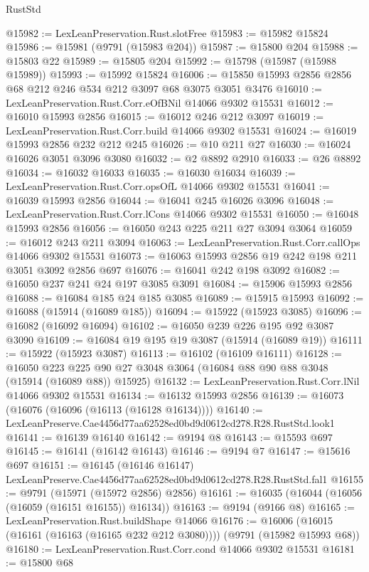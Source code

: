 \begin{lexlean}{RustStd}
\begin{coremodule}
@15982 := LexLeanPreservation.Rust.slotFree
@15983 := @15982 @15824
@15986 := @15981 (@9791 (@15983 @204))
@15987 := @15800 @204
@15988 := @15803 @22
@15989 := @15805 @204
@15992 := @15798 (@15987 (@15988 @15989))
@15993 := @15992 @15824
@16006 := @15850 @15993 @2856 @2856 @68 @212 @246 @534 @212 @3097 @68 @3075 @3051 @3476
@16010 := LexLeanPreservation.Rust.Corr.eOfBNil @14066 @9302 @15531
@16012 := @16010 @15993 @2856
@16015 := @16012 @246 @212 @3097
@16019 := LexLeanPreservation.Rust.Corr.build @14066 @9302 @15531
@16024 := @16019 @15993 @2856 @232 @212 @245
@16026 := @10 @211 @27
@16030 := @16024 @16026 @3051 @3096 @3080
@16032 := @2 @8892 @2910
@16033 := @26 @8892
@16034 := @16032 @16033
@16035 := @16030 @16034
@16039 := LexLeanPreservation.Rust.Corr.opsOfL @14066 @9302 @15531
@16041 := @16039 @15993 @2856
@16044 := @16041 @245 @16026 @3096
@16048 := LexLeanPreservation.Rust.Corr.lCons @14066 @9302 @15531
@16050 := @16048 @15993 @2856
@16056 := @16050 @243 @225 @211 @27 @3094 @3064
@16059 := @16012 @243 @211 @3094
@16063 := LexLeanPreservation.Rust.Corr.callOps @14066 @9302 @15531
@16073 := @16063 @15993 @2856 @19 @242 @198 @211 @3051 @3092 @2856 @697
@16076 := @16041 @242 @198 @3092
@16082 := @16050 @237 @241 @24 @197 @3085 @3091
@16084 := @15906 @15993 @2856
@16088 := @16084 @185 @24 @185 @3085
@16089 := @15915 @15993
@16092 := @16088 (@15914 (@16089 @185))
@16094 := @15922 (@15923 @3085)
@16096 := @16082 (@16092 @16094)
@16102 := @16050 @239 @226 @195 @92 @3087 @3090
@16109 := @16084 @19 @195 @19 @3087 (@15914 (@16089 @19))
@16111 := @15922 (@15923 @3087)
@16113 := @16102 (@16109 @16111)
@16128 := @16050
    @223
    @225
    @90
    @27
    @3048
    @3064
    (@16084 @88 @90 @88 @3048 (@15914 (@16089 @88)) @15925)
@16132 := LexLeanPreservation.Rust.Corr.lNil @14066 @9302 @15531
@16134 := @16132 @15993 @2856
@16139 := @16073 (@16076 (@16096 (@16113 (@16128 @16134))))
@16140 := LexLeanPreserve.Cae4456d77aa62528ed0bd9d0612cd278.R28.RustStd.look1
@16141 := @16139 @16140
@16142 := @9194 @8
@16143 := @15593 @697
@16145 := @16141 (@16142 @16143)
@16146 := @9194 @7
@16147 := @15616 @697
@16151 := @16145 (@16146 @16147) LexLeanPreserve.Cae4456d77aa62528ed0bd9d0612cd278.R28.RustStd.fal1
@16155 := @9791 (@15971 (@15972 @2856) @2856)
@16161 := @16035 (@16044 (@16056 (@16059 (@16151 @16155)) @16134))
@16163 := @9194 (@9166 @8)
@16165 := LexLeanPreservation.Rust.buildShape @14066
@16176 := @16006 (@16015 (@16161 (@16163 (@16165 @232 @212 @3080)))) (@9791 (@15982 @15993 @68))
@16180 := LexLeanPreservation.Rust.Corr.cond @14066 @9302 @15531
@16181 := @15800 @68

\end{coremodule}
\end{lexlean}
